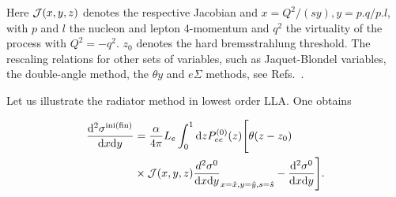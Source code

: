 \begin{table}
\centering

\caption{\label{TAB:KIN} Scaling behavior of various sets of kinematic variables for leptonic initial and final state
radiation, cf. \cite{Arbuzov:1995id,Blumlein:2012bf}. The shifted variables $\hat{Q^2}$, $\hat{y}$, the threshold $z_0$ and the Jacobian ${\cal J}$ depend on the choice of the
external kinematic variables.}
\end{table}

Here ${\cal J}(x,y,z)$ denotes the respective Jacobian and $x =  Q^2/(s y), y = p.q/p.l$, with 
$p$ and $l$ the nucleon and lepton 4-momentum and $q^2$ the virtuality of the process with $Q^2 = - q^2$.
$z_0$ denotes the hard bremsstrahlung threshold.
The rescaling relations for other sets of variables, such as Jaquet-Blondel variables,
the double-angle method, the $\theta y$ and  $e \Sigma$ methods, see Refs.~\cite{Arbuzov:1995id,Blumlein:2012bf}.

Let us illustrate the radiator method in lowest order LLA. One obtains

\begin{align}\frac{\mathrm{d}^2 \sigma^{\rm ini(fin)}}{\mathrm{d} x \mathrm{d} y}& =
\frac{\alpha}{4 \pi}
L_e
\int_0^1 \mathrm{d} z
 P_{ee}^{(0)}(z)  
\Biggl[
\theta(z - z_0) \nonumber \\
&\times{\cal J}(x,y,z)
\frac{d^2 \sigma^{0}}{\mathrm{d} x \mathrm{d} y}_{x=\hat{x},
y=\hat{y},s=\hat{s}}   
-  \frac{\mathrm{d}^2 \sigma^{0}}{\mathrm{d} x \mathrm{d} y} \Biggr].
\end{align}

